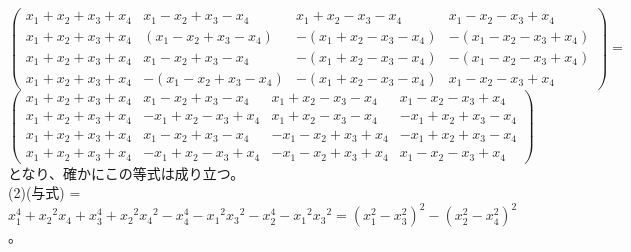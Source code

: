 \documentclass[11pt]{jsarticle}
\begin{document}
$\left(
\begin{array}{cccc}
    x_1+x_2+x_3+x_4 & x_1-x_2+x_3-x_4 & x_1+x_2-x_3-x_4 & x_1-x_2-x_3+x_4 \\
    x_1+x_2+x_3+x_4 & (x_1-x_2+x_3-x_4) & -(x_1+x_2-x_3-x_4) & -(x_1-x_2-x_3+x_4) \\
    x_1+x_2+x_3+x_4 & x_1-x_2+x_3-x_4 & -(x_1+x_2-x_3-x_4) & -(x_1-x_2-x_3+x_4) \\
    x_1+x_2+x_3+x_4 & -(x_1-x_2+x_3-x_4) & -(x_1+x_2-x_3-x_4) & x_1-x_2-x_3+x_4
\end{array}
\right) = $
    $\left(
\begin{array}{cccc}
    x_1+x_2+x_3+x_4 & x_1-x_2+x_3-x_4 & x_1+x_2-x_3-x_ 4 & x_1-x_2-x_3+x_4 \\
    x_1+x_2+x_3+x_4 & -x_1+x_2-x_3+x_4 & x_1+x_2-x_3-x_4 & -x_1+x_2+x_3-x_4 \\
    x_1+x_2+x_3+x_4 & x_1-x_2+x_3-x_4 & -x_1-x_2+x_3+x_4 & -x_1+x_2+x_3-x_4 \\
    x_1+x_2+x_3+x_4 & -x_1+x_2-x_3+x_4 & -x_1-x_2+x_3+x_4 & x_1-x_2-x_3+x_4
\end{array}
\right)$となり、確かにこの等式は成り立つ。\\
(2)(与式) = $x_1^4+{x_2}^2{x_4}+x_3^4+{x_2}^2{x_4}^2 -x_4^4 -{x_1}^2{x_3}^2-x_2^4-{x_1}^2{x_3}^2 = (x_1^2 - x_3^2)^2-(x_2^2 - x_4^2)^2$。
\end{document}
